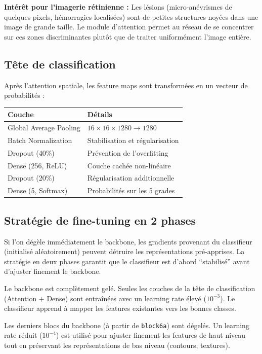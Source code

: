 \documentclass[11pt,a4paper]{article}
\begin{document}
\textbf{Intérêt pour l'imagerie rétinienne :} Les lésions (micro-anévrismes de quelques pixels, hémorragies localisées) sont de petites structures noyées dans une image de grande taille. Le module d'attention permet au réseau de se concentrer sur ces zones discriminantes plutôt que de traiter uniformément l'image entière.

\subsection{Tête de classification}

Après l'attention spatiale, les feature maps sont transformées en un vecteur de probabilités :

\begin{center}
\renewcommand{\arraystretch}{1.4}
\begin{tabular}{ll}
\toprule
\textbf{Couche} & \textbf{Détails} \\
\midrule
Global Average Pooling & $16 \times 16 \times 1280 \to 1280$ \\
Batch Normalization & Stabilisation et régularisation \\
Dropout (40\%) & Prévention de l'overfitting \\
Dense (256, ReLU) & Couche cachée non-linéaire \\
Dropout (20\%) & Régularisation additionnelle \\
Dense (5, Softmax) & Probabilités sur les 5 grades \\
\bottomrule
\end{tabular}
\end{center}

\subsection{Stratégie de fine-tuning en 2 phases}

\begin{warnbox}
Si l'on dégèle immédiatement le backbone, les gradients provenant du classifieur (initialisé aléatoirement) peuvent détruire les représentations pré-apprises. La stratégie en deux phases garantit que le classifieur est d'abord ``stabilisé'' avant d'ajuster finement le backbone.
\end{warnbox}

\begin{description}[leftmargin=2em]
  \item[Phase 1 -- Warmup (5 epochs)] Le backbone est complètement gelé. Seules les couches de la tête de classification (Attention + Dense) sont entraînées avec un learning rate élevé ($10^{-3}$). Le classifieur apprend à mapper les features existantes vers les bonnes classes.

  \item[Phase 2 -- Fine-tuning (30 epochs)] Les derniers blocs du backbone (à partir de \texttt{block6a}) sont dégelés. Un learning rate réduit ($10^{-4}$) est utilisé pour ajuster finement les features de haut niveau tout en préservant les représentations de bas niveau (contours, textures).
\end{description}
\end{document}
